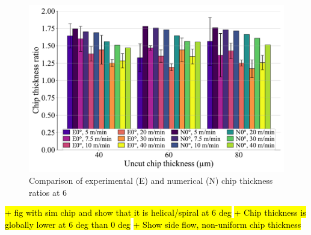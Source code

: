 \documentclass[preprint,12pt,times]{elsarticle}
\begin{document}
\begin{figure}[h]
\centering
\includegraphics[width = 140 mm]{Figures/h6}
\caption{Comparison of experimental (E) and numerical (N) chip thickness ratios at 6\textdegree{}}
\label{h6}
\end{figure}

\hl{+ fig with sim chip and show that it is helical/spiral at 6 deg}
\hl{+ Chip thickness is globally lower at 6 deg than 0 deg}
\hl{+ Show side flow, non-uniform chip thickness}
\end{document}
